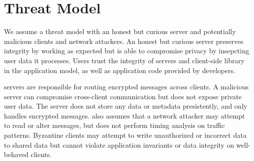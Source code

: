 \section{Threat Model}


We assume a threat model with an honest but curious server and potentially malicious clients and network attackers. An honest but curious server preserves integrity by working as expected but is able to compromise privacy by insepcting user data it processes. Users trust the integrity of servers and client-side library in the application model, as well as application code provided by developers. 

\name{} servers are responsible for routing encrypted messages across clients. A malicious server can compromise cross-client communication but does not expose private user data. The server does not store any data or metadata presistently, and only handles encrypted messages. \name{} also assumes that a network attacker may attempt to read or alter messages, but does not perform timing analysis on traffic patterns. Byzantine clients may attempt to write unauthorized or incorrect data to shared data but cannot violate application invariants  or data integrity on well-behaved clients. 

